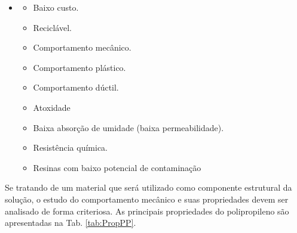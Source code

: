 \begin{itemize} 

    \item[ ] 

    \begin{itemize} 

        \item Baixo custo. 

        \item Reciclável. 

        \item Comportamento mecânico.  

        \item Comportamento plástico. 

        \item Comportamento dúctil. 

        \item Atoxidade 

        \item Baixa absorção de umidade (baixa permeabilidade). 

        \item Resistência química. 

        \item Resinas com baixo potencial de contaminação 
    \end{itemize} 

\end{itemize} 

 

 

Se tratando de um material que será utilizado como componente estrutural da solução, o estudo do comportamento mecânico e suas propriedades devem ser analisado de forma criteriosa. As principais propriedades do polipropileno são apresentadas na Tab. \ref{tab:PropPP}.  

  

